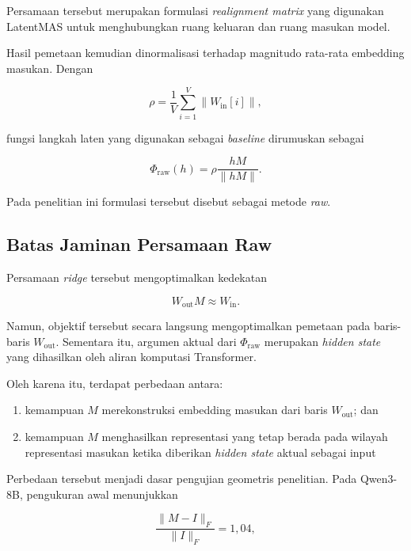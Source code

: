 Persamaan tersebut merupakan formulasi \textit{realignment matrix} yang digunakan LatentMAS untuk menghubungkan ruang keluaran dan ruang masukan model.

Hasil pemetaan kemudian dinormalisasi terhadap magnitudo rata-rata embedding masukan. Dengan

\begin{equation}
\rho=
\frac{1}{V}
\sum_{i=1}^{V}
\left\|
W_{\mathrm{in}}[i]
\right\|,
\end{equation}

fungsi langkah laten yang digunakan sebagai \textit{baseline} dirumuskan sebagai

\begin{equation}
\Phi_{\mathrm{raw}}(h)
=
\rho
\frac{hM}{\|hM\|}.
\end{equation}

Pada penelitian ini formulasi tersebut disebut sebagai metode \textit{raw}.

\subsection{Batas Jaminan Persamaan Raw}

Persamaan \textit{ridge} tersebut mengoptimalkan kedekatan

\[
W_{\mathrm{out}}M\approx W_{\mathrm{in}}.
\]

Namun, objektif tersebut secara langsung mengoptimalkan pemetaan pada baris-baris \(W_{\mathrm{out}}\). Sementara itu, argumen aktual dari \(\Phi_{\mathrm{raw}}\) merupakan \textit{hidden state} yang dihasilkan oleh aliran komputasi Transformer.

Oleh karena itu, terdapat perbedaan antara:

\begin{enumerate}
    \item kemampuan \(M\) merekonstruksi embedding masukan dari baris \(W_{\mathrm{out}}\); dan
    \item kemampuan \(M\) menghasilkan representasi yang tetap berada pada wilayah representasi masukan ketika diberikan \textit{hidden state} aktual sebagai input
\end{enumerate}

Perbedaan tersebut menjadi dasar pengujian geometris penelitian. Pada Qwen3-8B, pengukuran awal menunjukkan

\begin{equation}
\frac{\|M-I\|_F}{\|I\|_F}=1{,}04,
\end{equation}

